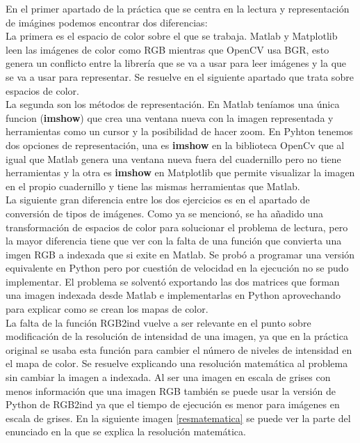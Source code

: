 \documentclass[a4paper,12pt]{report}
\begin{document}
En el primer apartado de la práctica que se centra en la lectura y representación de imágines podemos encontrar dos diferencias:\\

La primera es el espacio de color sobre el que se trabaja. Matlab y Matplotlib leen las imágenes de color como RGB mientras que OpenCV usa BGR, esto genera un conflicto entre la librería que se va a usar para leer imágenes y la que se va a usar para representar. Se resuelve en el siguiente apartado que trata sobre espacios de color.\\

La segunda son los métodos de representación. En Matlab teníamos una única funcion (\textbf{imshow}) que crea una ventana nueva con la imagen representada y herramientas como un cursor y la posibilidad de hacer zoom. En Pyhton tenemos dos opciones de representación, una es \textbf{imshow} en la biblioteca  OpenCv que al igual que Matlab genera una ventana nueva fuera del cuadernillo pero no tiene herramientas y la otra es \textbf{imshow} en Matplotlib que permite visualizar la imagen en el propio cuadernillo y tiene las mismas herramientas que Matlab.\\

La siguiente gran diferencia entre los dos ejercicios es en el apartado de conversión de tipos de imágenes. Como ya se mencionó, se ha añadido una transformación de espacios de color para solucionar el problema de lectura, pero la mayor diferencia tiene que ver con la falta de una función que convierta una imgen RGB a indexada que si exite en Matlab. Se probó a programar una versión equivalente en Python pero por cuestión de velocidad en la ejecución no se pudo implementar. El problema se solventó exportando las dos matrices que forman una imagen indexada desde Matlab  e implementarlas en Python aprovechando para explicar como se crean los mapas de color.\\

La falta de la función RGB2ind vuelve a ser relevante en el punto sobre modificación de la resolución de intensidad de una imagen, ya que en la práctica original se usaba esta función para cambier el número de niveles de intensidad en el mapa de color. Se resuelve explicando una resolución matemática al problema sin cambiar la imagen a indexada. Al ser una imagen en escala de grises con menos información que una imagen RGB también se puede usar la versión de Python de RGB2ind ya que el tiempo de ejecución es menor para imágenes en escala de grises. En la siguiente imagen \ref{resmatematica} se puede ver la parte del enunciado en la que se explica la resolución matemática. 
\end{document}
